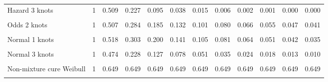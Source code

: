 \documentclass[
]{article}
\begin{document}
\begin{table}[H]
{\begin{tabular}[t]{lrrrrrrrrrrr}
Hazard 3 knots & 1 & 0.509 & 0.227 & 0.095 & 0.038 & 0.015 & 0.006 & 0.002 & 0.001 & 0.000 & 0.000\\
\cellcolor{gray!10}{Odds 1 knots} & \cellcolor{gray!10}{1} & \cellcolor{gray!10}{0.533} & \cellcolor{gray!10}{0.326} & \cellcolor{gray!10}{0.227} & \cellcolor{gray!10}{0.171} & \cellcolor{gray!10}{0.135} & \cellcolor{gray!10}{0.111} & \cellcolor{gray!10}{0.093} & \cellcolor{gray!10}{0.080} & \cellcolor{gray!10}{0.070} & \cellcolor{gray!10}{0.062}\\
Odds 2 knots & 1 & 0.507 & 0.284 & 0.185 & 0.132 & 0.101 & 0.080 & 0.066 & 0.055 & 0.047 & 0.041\\
\cellcolor{gray!10}{Odds 3 knots} & \cellcolor{gray!10}{1} & \cellcolor{gray!10}{0.473} & \cellcolor{gray!10}{0.229} & \cellcolor{gray!10}{0.135} & \cellcolor{gray!10}{0.090} & \cellcolor{gray!10}{0.065} & \cellcolor{gray!10}{0.049} & \cellcolor{gray!10}{0.039} & \cellcolor{gray!10}{0.032} & \cellcolor{gray!10}{0.026} & \cellcolor{gray!10}{0.022}\\
Normal 1 knots & 1 & 0.518 & 0.303 & 0.200 & 0.141 & 0.105 & 0.081 & 0.064 & 0.051 & 0.042 & 0.035\\
\cellcolor{gray!10}{Normal 2 knots} & \cellcolor{gray!10}{1} & \cellcolor{gray!10}{0.514} & \cellcolor{gray!10}{0.297} & \cellcolor{gray!10}{0.193} & \cellcolor{gray!10}{0.135} & \cellcolor{gray!10}{0.100} & \cellcolor{gray!10}{0.076} & \cellcolor{gray!10}{0.059} & \cellcolor{gray!10}{0.048} & \cellcolor{gray!10}{0.039} & \cellcolor{gray!10}{0.032}\\
Normal 3 knots & 1 & 0.474 & 0.228 & 0.127 & 0.078 & 0.051 & 0.035 & 0.024 & 0.018 & 0.013 & 0.010\\
\cellcolor{gray!10}{Mixture cure Weibull} & \cellcolor{gray!10}{1} & \cellcolor{gray!10}{0.652} & \cellcolor{gray!10}{0.652} & \cellcolor{gray!10}{0.652} & \cellcolor{gray!10}{0.652} & \cellcolor{gray!10}{0.652} & \cellcolor{gray!10}{0.652} & \cellcolor{gray!10}{0.652} & \cellcolor{gray!10}{0.652} & \cellcolor{gray!10}{0.652} & \cellcolor{gray!10}{0.652}\\
Non-mixture cure Weibull & 1 & 0.649 & 0.649 & 0.649 & 0.649 & 0.649 & 0.649 & 0.649 & 0.649 & 0.649 & 0.649\\
\cellcolor{gray!10}{Mixture cure Log-normal} & \cellcolor{gray!10}{1} & \cellcolor{gray!10}{0.600} & \cellcolor{gray!10}{0.573} & \cellcolor{gray!10}{0.571} & \cellcolor{gray!10}{0.571} & \cellcolor{gray!10}{0.571} & \cellcolor{gray!10}{0.571} & \cellcolor{gray!10}{0.571} & \cellcolor{gray!10}{0.571} & \cellcolor{gray!10}{0.571} & \cellcolor{gray!10}{0.571}\\

\end{tabular}}
\end{table}
\end{document}
